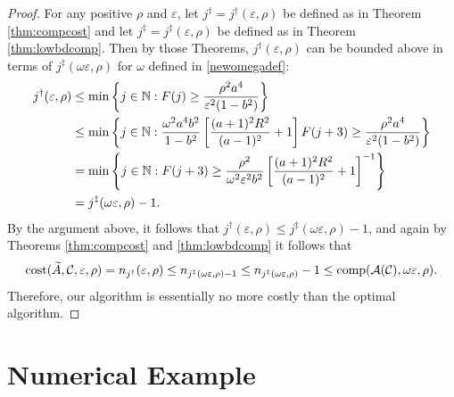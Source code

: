 \documentclass[graybox,footinfo]{svmult}
\begin{document}
\begin{proof}
For any positive $\rho$ and $\varepsilon$, let $j^\dagger = j^\dagger(\varepsilon,\rho)$ be defined as in Theorem \ref{thm:compcost} and let $j^\ddagger = j^\ddagger(\varepsilon,\rho)$ be defined as in Theorem \ref{thm:lowbdcomp}.  Then by those Theorems, $j^\dagger(\varepsilon,\rho)$ can be bounded above in terms of $ j^{\ddagger}(\omega\varepsilon,\rho)$ for $\omega$ defined in \eqref{newomegadef}:
\begin{align*} 
j^\dagger(\varepsilon,\rho) &\le \min \left \{j \in {\mathbb{N}} : F(j) \ge \frac{\rho^2 a^4}{\varepsilon^2 (1-b^2)}   \right\} \\
& \le \min \left \{j \in {\mathbb{N}} : \frac{\omega^2 a^4 b^2}{1 - b^2}\left[\frac{(a+1)^{2} R^2 }{(a-1)^2} + 1\right] F(j+3) \ge \frac{\rho^2 a^4}{\varepsilon^2 (1-b^2)}    \right\} \\
& = \min \left \{j \in {\mathbb{N}} :  F(j+3) \ge \frac{\rho^2}{\omega^2 \varepsilon^2 b^2} \left[\frac{(a+1)^{2} R^2 }{(a-1)^2} + 1\right]^{-1} \right\} \\
& = j^{\ddagger}(\omega\varepsilon,\rho) - 1.
\end{align*}
By the argument above, it follows that $ j^\dagger(\varepsilon,\rho) \le j^\ddagger(\omega\varepsilon,\rho) -1$, and again by Theorems \ref{thm:compcost} and  \ref{thm:lowbdcomp} it follows that 
\[
\textup{cost}(\widetilde{A},{\mathcal{C}},\varepsilon,\rho)
= n_{j^\dagger}(\varepsilon,\rho)
\le n_{j^{\ddagger}(\omega\varepsilon,\rho)-1} 
\le n_{j^{\ddagger}(\omega\varepsilon,\rho)} -1 
\le \textup{comp}({\mathcal{A}}({\mathcal{C}}),\omega\varepsilon,\rho) .
\]
Therefore, our algorithm is essentially no more costly than the optimal algorithm. 
\end{proof}

 


\section{Numerical Example} \label{sec:examp}
\end{document}
